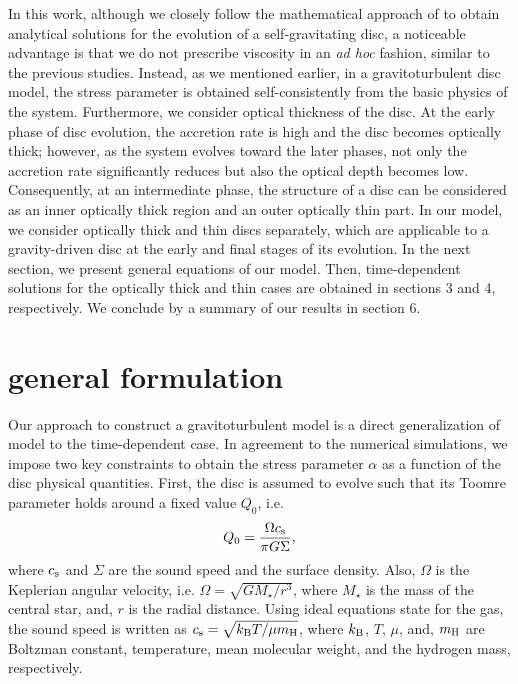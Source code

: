 \documentclass[apj]{emulateapj}
\begin{document}
In this work, although we closely follow the mathematical approach of \cite{chambers} to obtain analytical solutions for the evolution of a self-gravitating disc, a noticeable advantage is that we do not prescribe viscosity in an {\it ad hoc} fashion, similar to the previous studies. Instead, as we mentioned earlier, in a gravitoturbulent disc model, the stress parameter is obtained self-consistently from the basic physics of the system. Furthermore, we consider optical thickness of the disc. At the early phase of disc evolution, the accretion rate is high and the disc becomes optically thick; however, as the system evolves toward the later phases, not only the accretion rate significantly reduces but also the optical depth becomes low. Consequently, at an  intermediate phase, the structure of a disc can be considered as an inner optically thick region and an outer optically thin part. In our model, we consider optically thick and thin discs separately, which are applicable to a gravity-driven disc at the early and final stages of its evolution. In the next section, we present general equations of our model. Then, time-dependent solutions for the optically thick and thin cases are obtained in sections 3 and 4, respectively. We conclude by a summary of our results in section 6.







\section{general formulation}
%
%
Our approach to construct a gravitoturbulent model is a direct generalization of \cite{rafikov2009} model to the time-dependent case. In agreement to the numerical simulations, we impose two key constraints to obtain the stress parameter $\alpha$ as a function of the disc physical quantities. First, the disc is assumed to evolve such that its Toomre parameter holds around a fixed value $Q_0$, i.e. 
%
\begin{equation}\label{eq:Q}
Q_0 = \frac{\Omega c_{\rm s}}{\pi G \Sigma},
\end{equation}
%
where $c_{\rm s}$ and $\Sigma$ are the sound speed and the surface density. Also, $\Omega$ is the Keplerian angular velocity, i.e. $\Omega = \sqrt{GM_{\star}/r^3}$, where $M_{\star}$ is the mass of the central star, and,  $r$ is the radial distance. Using ideal equations state for the gas, the sound speed is written as $c_{\rm s}=\sqrt{k_{\rm B}T/\mu m_{\rm H}}$, where $k_{\rm B}$, $T$, $\mu$, and, $m_{\rm H}$ are Boltzman constant, temperature, mean molecular weight, and the hydrogen mass, respectively. 
\end{document}
